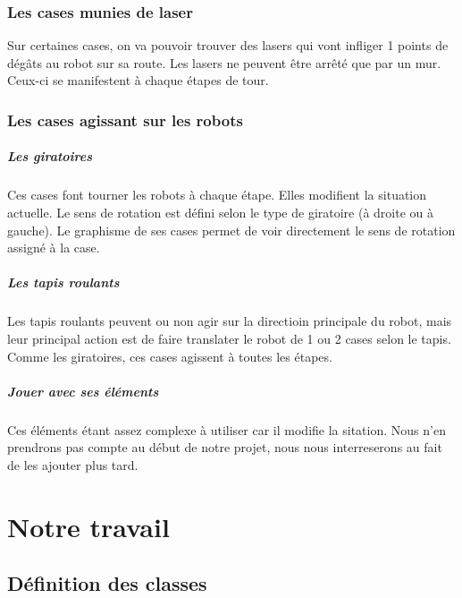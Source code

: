 \documentclass[a4paper,12pt]{report}
\begin{document}
 		\subsection{Les cases munies de laser}

Sur certaines cases, on va pouvoir trouver des lasers qui vont infliger 1 points de dégâts au robot sur sa route. Les lasers ne peuvent être arrêté que par un mur. Ceux-ci se manifestent à chaque étapes de tour.

		\subsection{Les cases agissant sur les robots}
		
			\paragraph{Les giratoires}
			
Ces cases font tourner les robots à chaque étape. Elles modifient la situation actuelle. Le sens de rotation est défini selon le type de giratoire (à droite ou à gauche). Le graphisme de ses cases permet de voir directement le sens de rotation assigné à la case.

			\paragraph{Les tapis roulants}
			
Les tapis roulants peuvent ou non agir sur la directioin principale du robot, mais leur principal action est de faire translater le robot de 1 ou 2 cases selon le tapis. Comme les giratoires, ces cases agissent à toutes les étapes. 

			\paragraph{Jouer avec ses éléments}
			
Ces éléments étant assez complexe à utiliser car il modifie la sitation. Nous n'en prendrons pas compte au début de notre projet, nous nous interreserons au fait de les ajouter plus tard.



	\chapter{Notre travail}

	\section{Définition des classes}
\end{document}
